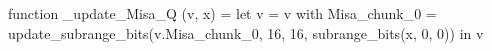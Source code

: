 function _update_Misa_Q (v, x) = let v = { v with Misa_chunk_0 = update_subrange_bits(v.Misa_chunk_0, 16, 16, subrange_bits(x, 0, 0)) } in
  v
